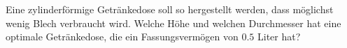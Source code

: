 \begin{ExerciseBlock}
Eine zylinderförmige Getränkedose soll so hergestellt werden, dass möglichst wenig Blech verbraucht wird. Welche Höhe und welchen Durchmesser hat eine optimale Getränkedose, die ein Fassungsvermögen von $0.5$ Liter hat?

\end{ExerciseBlock}
